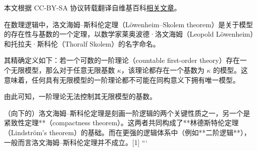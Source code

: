 
本文根据 CC-BY-SA 协议转载翻译自维基百科\href{https://en.wikipedia.org/wiki/L\%C3\%B6wenheim\%E2\%80\%93Skolem_theorem}{相关文章}。

在数理逻辑中，洛文海姆–斯科伦定理（Löwenheim–Skolem theorem）是关于模型的存在性与基数的一个定理，以数学家莱奥波德·洛文海姆（Leopold Löwenheim）和托拉夫·斯科伦（Thoralf Skolem）的名字命名。  

其精确定义如下：若一个可数的一阶理论（countable first-order theory）存在一个无限模型，那么对于任意无限基数 \(\kappa\)，该理论都存在一个基数为 \(\kappa\) 的模型。这意味着，任何具有无限模型的一阶理论都不可能在同构意义下拥有唯一模型。  

由此可知，一阶理论无法控制其无限模型的基数。  

（向下的）洛文海姆–斯科伦定理是刻画一阶逻辑的两个关键性质之一，另一个是紧致性定理**（compactness theorem）。这两者共同构成了**林德斯特伦定理（Lindström’s theorem）的基础。而在更强的逻辑体系中（例如**二阶逻辑**），一般而言洛文海姆–斯科伦定理并不成立。[1]  
```
